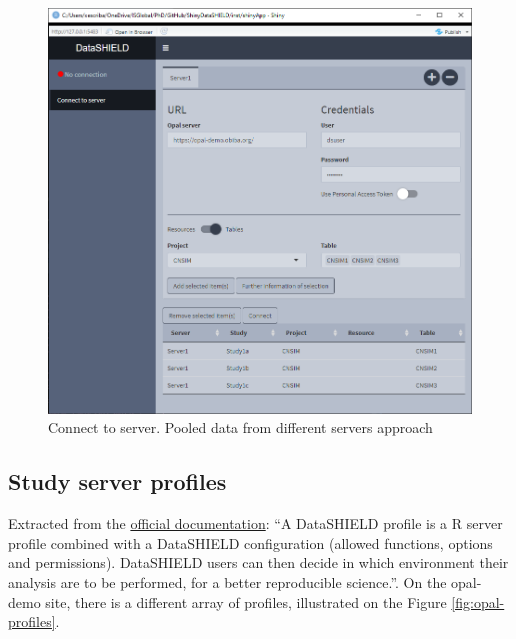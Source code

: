 \documentclass[
]{book}
\begin{document}
\begin{figure}

{\centering \includegraphics[width=12.68in]{images/data_entry10} 

}

\caption{Connect to server. Pooled data from different servers approach}\label{fig:dataentry10}
\end{figure}

\hypertarget{profiles}{%
\subsection{Study server profiles}\label{profiles}}

Extracted from the \href{https://opaldoc.obiba.org/en/latest/admin/rserver.html}{official documentation}: ``A DataSHIELD profile is a R server profile combined with a DataSHIELD configuration (allowed functions, options and permissions). DataSHIELD users can then decide in which environment their analysis are to be performed, for a better reproducible science.''. On the opal-demo site, there is a different array of profiles, illustrated on the Figure \ref{fig:opal-profiles}.
\end{document}
